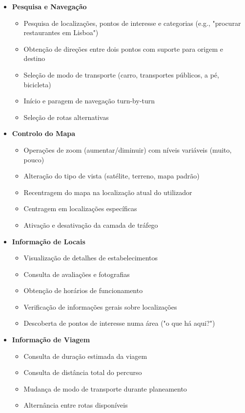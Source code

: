 \begin{itemize}
    \item \textbf{Pesquisa e Navegação}
    \begin{itemize}
        \item Pesquisa de localizações, pontos de interesse e categorias (e.g., "procurar restaurantes em Lisboa")
        \item Obtenção de direções entre dois pontos com suporte para origem e destino
        \item Seleção de modo de transporte (carro, transportes públicos, a pé, bicicleta)
        \item Início e paragem de navegação turn-by-turn
        \item Seleção de rotas alternativas
    \end{itemize}

    \item \textbf{Controlo do Mapa}
    \begin{itemize}
        \item Operações de zoom (aumentar/diminuir) com níveis variáveis (muito, pouco)
        \item Alteração do tipo de vista (satélite, terreno, mapa padrão)
        \item Recentragem do mapa na localização atual do utilizador
        \item Centragem em localizações específicas
        \item Ativação e desativação da camada de tráfego
    \end{itemize}

    \item \textbf{Informação de Locais}
    \begin{itemize}
        \item Visualização de detalhes de estabelecimentos
        \item Consulta de avaliações e fotografias
        \item Obtenção de horários de funcionamento
        \item Verificação de informações gerais sobre localizações
        \item Descoberta de pontos de interesse numa área ("o que há aqui?")
    \end{itemize}

    \item \textbf{Informação de Viagem}
    \begin{itemize}
        \item Consulta de duração estimada da viagem
        \item Consulta de distância total do percurso
        \item Mudança de modo de transporte durante planeamento
        \item Alternância entre rotas disponíveis
    \end{itemize}


\end{itemize}
